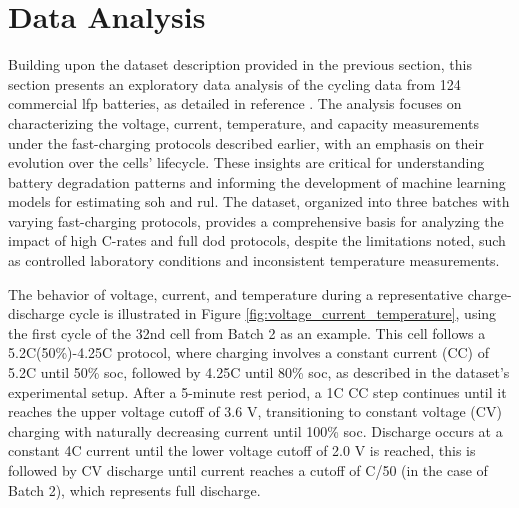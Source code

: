 \section{Data Analysis} \label{sec:data_analysis}
Building upon the dataset description provided in the previous section, this section presents an exploratory data analysis of the cycling data from 124 commercial \acf{lfp} batteries, as detailed in reference \cite{sev2019}. The analysis focuses on characterizing the voltage, current, temperature, and capacity measurements under the fast-charging protocols described earlier, with an emphasis on their evolution over the cells' lifecycle. These insights are critical for understanding battery degradation patterns and informing the development of machine learning models for estimating \acf{soh} and \acf{rul}. The dataset, organized into three batches with varying fast-charging protocols, provides a comprehensive basis for analyzing the impact of high C-rates and full \acf{dod} protocols, despite the limitations noted, such as controlled laboratory conditions and inconsistent temperature measurements.

The behavior of voltage, current, and temperature during a representative charge-discharge cycle is illustrated in Figure \ref{fig:voltage_current_temperature}, using the first cycle of the 32nd cell from Batch 2 as an example. This cell follows a 5.2C(50\%)-4.25C protocol, where charging involves a constant current (CC) of 5.2C until 50\% \acf{soc}, followed by 4.25C until 80\% \ac{soc}, as described in the dataset's experimental setup. After a 5-minute rest period, a 1C CC step continues until it reaches the upper voltage cutoff of 3.6 V, transitioning to constant voltage (CV) charging with naturally decreasing current until 100\% \ac{soc}. Discharge occurs at a constant 4C current until the lower voltage cutoff of 2.0 V is reached, this is followed by CV discharge until current reaches a cutoff of C/50 (in the case of Batch 2), which represents  full discharge. 



